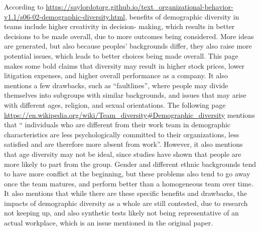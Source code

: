 \documentclass[letterpaper,12pt]{article}
\begin{document}
According to \url{https://saylordotorg.github.io/text_organizational-behavior-v1.1/s06-02-demographic-diversity.html},
benefits of demographic diversity in teams include higher creativity in decision- making, which results in
better decisions to be made overall, due to more outcomes being considered. More ideas are generated, but also
because peoples' backgrounds differ, they also raise more potential issues, which leads to better choices being made overall.
This page makes some bold claims that diversity may result in higher stock prices, lower litigation expenses, and higher overall performance as a company. It also mentions a few drawbacks, such as ``faultlines'', where people may divide themselves
into subgroups with similar backgrounds, and issues that may arise with different ages, religion, and sexual orientations.
The following page \url{https://en.wikipedia.org/wiki/Team_diversity#Demographic_diversity} mentions that
`` individuals who are different from their work team in demographic characteristics are less psychologically committed to their organizations, less satisfied and are therefore more absent from work''. However, it also mentions that age diversity may not be
ideal, since studies have shown that people are more likely to part from the group. Gender and different ethnic backgrounds
tend to have more conflict at the beginning, but these problems also tend to go away once the team matures, and perform better
than a homogeneous team over time. It also mentions that while there are these specific benefits and drawbacks, the impacts
of demographic diversity as a whole are still contested, due to research not keeping up, and also synthetic tests
likely not being representative of an actual workplace, which is an issue mentioned in the original paper.
\end{document}
